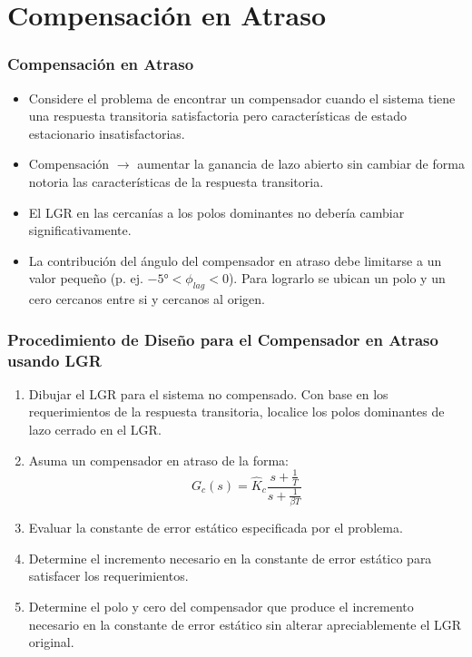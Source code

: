 \documentclass[aspectratio=169,handout]{beamer}
\theoremstyle{definition}
\theoremstyle{plain}
\theoremstyle{remark}
\newcounter{saveenumi}
\newcommand{\seti}{\setcounter{saveenumi}{\value{enumi}}}
\begin{document}
\section{Compensación en Atraso}
\begin{frame}[<+->]\frametitle{Compensación en Atraso}
	\begin{itemize}
		\item Considere el problema de encontrar un compensador cuando el sistema tiene una respuesta transitoria satisfactoria pero características de estado estacionario insatisfactorias.
		\item Compensación $\rightarrow$ aumentar la ganancia de lazo abierto sin cambiar de forma notoria las características de la respuesta transitoria.
		\item El LGR en las cercanías a los polos dominantes no debería cambiar significativamente.
		\item La contribución del ángulo del compensador en atraso debe limitarse a un valor pequeño (p. ej. $-\ang{5} < \phi_{lag} < 0$). Para lograrlo se ubican un polo y un cero cercanos entre si y cercanos al origen.
	\end{itemize}
\end{frame}

\begin{frame}[<+->]\frametitle{Procedimiento de Diseño para el Compensador en Atraso usando LGR}
	\begin{enumerate}
		\item Dibujar el LGR para el sistema no compensado. Con base en los requerimientos de la respuesta transitoria, localice los polos dominantes de lazo cerrado en el LGR.
		\item Asuma un compensador en atraso de la forma:
		\begin{equation*}
			G_c(s) = \hat{K}_c \frac{s+\frac{1}{T}}{s+\frac{1}{\beta T}}
		\end{equation*}
		\item Evaluar la constante de error estático especificada por el problema.
		\item Determine el incremento necesario en la constante de error estático para satisfacer los requerimientos.
		\item Determine el polo y cero del compensador que produce el incremento necesario en la constante de error estático sin alterar apreciablemente el LGR original.
		\seti
	\end{enumerate}
\end{frame}
\end{document}
